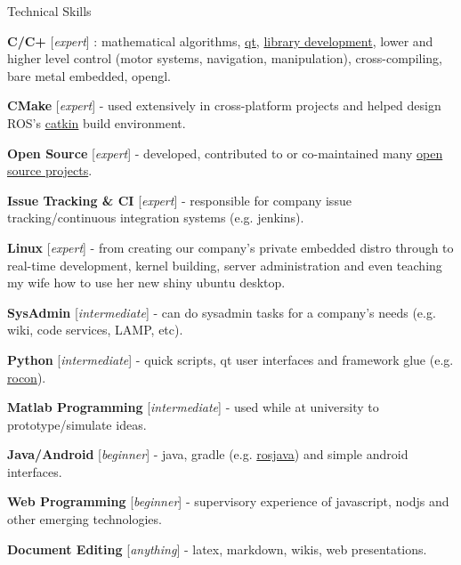 \documentclass[a4paper,10pt]{article}
\begin{document}
\begin{cvsection}{Technical Skills}
 \raggedright
  \begin{djs_itemize}
    \item \textbf{C/C+} [\textit{expert}] : mathematical algorithms, \href{https://github.com/Itseez/opencv/pull/3194}{qt}, \href{https://github.com/stonier/ecl_core}{library development}, lower and higher level control (motor systems, navigation, manipulation), cross-compiling, bare metal embedded, opengl.
    \item \textbf{CMake} [\textit{expert}] - used extensively in cross-platform projects and helped design ROS's \href{https://github.com/ros/catkin}{catkin} build environment.
    \item \textbf{Open Source} [\textit{expert}] - developed, contributed to or co-maintained many \href{https://github.com/stonier}{open source projects}.
    \item \textbf{Issue Tracking \& CI} [\textit{expert}] - responsible for company issue tracking/continuous integration systems (e.g. jenkins).
    \item \textbf{Linux} [\textit{expert}] - from creating our company's private embedded distro through to real-time development, kernel building, server administration and even teaching my wife how to use her new shiny ubuntu desktop.
    \item \textbf{SysAdmin} [\textit{intermediate}] - can do sysadmin tasks for a company's needs (e.g. wiki, code services, LAMP, etc).
    \item \textbf{Python} [\textit{intermediate}] - quick scripts, qt user interfaces and framework glue (e.g. \href{https://github.com/robotics-in-concert}{rocon}).
    \item \textbf{Matlab Programming} [\textit{intermediate}] - used while at university to prototype/simulate ideas.
    \item \textbf{Java/Android} [\textit{beginner}] - java, gradle (e.g. \href{https://github.com/rosjava}{rosjava}) and simple android interfaces.
    \item \textbf{Web Programming} [\textit{beginner}] - supervisory experience of javascript, nodjs and other emerging technologies.
    \item \textbf{Document Editing} [\textit{anything}] - latex, markdown, wikis, web presentations.
  \end{djs_itemize}
\end{cvsection}

\newpage
\end{document}
